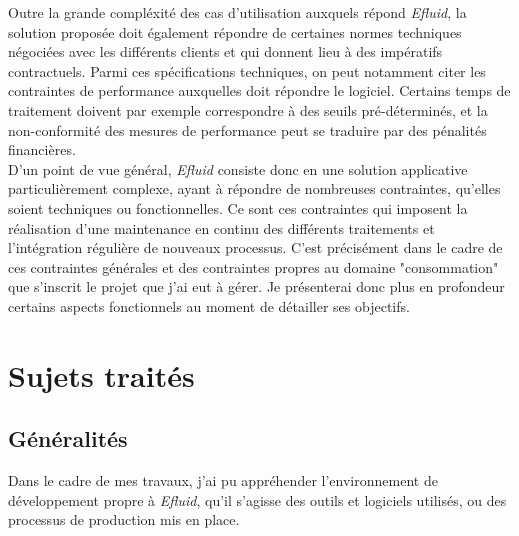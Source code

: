 \documentclass[a4paper, 12pt]{report}
\begin{document}
Outre la grande compléxité des cas d'utilisation auxquels répond \textit{Efluid}, la solution proposée doit également répondre de certaines normes techniques négociées avec les différents clients et qui donnent lieu à des impératifs contractuels. Parmi ces spécifications techniques, on peut notamment citer les contraintes de performance auxquelles doit répondre le logiciel. Certains temps de traitement doivent par exemple correspondre à des seuils pré-déterminés, et la non-conformité des mesures de performance peut se traduire par des pénalités financières.\\

D'un point de vue général, \textit{Efluid} consiste donc en une solution applicative particulièrement complexe, ayant à répondre de nombreuses contraintes, qu'elles soient techniques ou fonctionnelles. Ce sont ces contraintes qui imposent la réalisation d'une maintenance en continu des différents traitements et l'intégration régulière de nouveaux processus. C'est précisément dans le cadre de ces contraintes générales et des contraintes propres au domaine "consommation" que s'inscrit le projet que j'ai eut à gérer. Je présenterai donc plus en profondeur certains aspects fonctionnels au moment de détailler ses objectifs.

\chapter{Sujets traités}

\section{Généralités}

Dans le cadre de mes travaux, j'ai pu appréhender l'environnement de développement propre à \textit{Efluid}, qu'il s'agisse des outils et logiciels utilisés, ou des processus de production mis en place.
\end{document}
